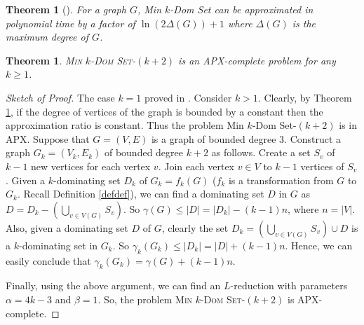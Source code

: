 \documentclass[a0,portrait]{a0poster}
\theoremstyle{definition}
\theoremstyle{plain}
\newtheorem{theorem}[definition]{Theorem}
\theoremstyle{definition}
\begin{document}
\begin{multicols}{2}
\begin{theorem}[\cite{cicalese2013approximability}]
\label{thm1kapx}
For a graph $G$, {\sc Min} $k$-{\sc Dom Set } can be approximated in polynomial time by a factor of $\ln(2\Delta(G))+1$ where $\Delta(G)$ is the maximum degree of  $G$.
\end{theorem}
\begin{theorem}
\label{thmApxkdom}
{\textsc{ Min}} $k$-{\textsc {Dom Set}}-$(k+2)$ is {an} APX-complete {problem} for any $k\geq 1$.
\end{theorem}
\begin{proof}[Sketch of Proof]
 The case $k=1$  proved in \cite{alimonti1997hardness}. Consider $k>1$. Clearly, by Theorem \ref{thm1kapx},  if {the degree of vertices of the graph} is bounded by a constant then the approximation ratio is constant. Thus {the} problem {\sc Min} $k$-{\sc Dom Set}-$(k+2)$ is in APX. Suppose that $G=(V, E)$ is a  graph  of bounded degree 3. Construct a graph $G_k = (V_k, E_k)$ of bounded degree $k +2$ as follows.
Create a set $S_v$ of $k-1$ new vertices for each vertex $v$. Join each vertex $v \in V$ to $k-1$ vertices of $S_v$. Given a $k$-dominating set $D_k$ of $G_k=f_k(G)$ ({$f_k$ is a transformation from $G$ to $G_k$. Recall Definition} \ref{defdef}),  we can  find a dominating set $D$ in $G$ as $D=D_k-\left(\bigcup_{v\in V(G)}{S_v}\right)$. 
So  $\gamma(G)\leq |D|= |D_k|-(k-1)n$, where $n =|V|$. Also, given a dominating set $D$  of $G$, clearly  the set
$D_k=\left(\bigcup_{v\in V(G)}{S_v}\right)\cup D$
is a $k$-dominating set in $G_k$. So 
$\gamma_k(G_k)\leq |D_k|= |D|+(k-1)n$. Hence, we can easily conclude that $\gamma_k(G_k)=\gamma(G)+(k-1)n$.


Finally, using the above argument, we can find an  $L$-reduction with parameters  $\alpha=4k-3$ and $\beta=1$. So, the problem {\textsc{ Min}} $k$-{\textsc {Dom Set}}-$(k+2)$ is APX-complete. 
\end{proof}

\end{multicols}
\end{document}
